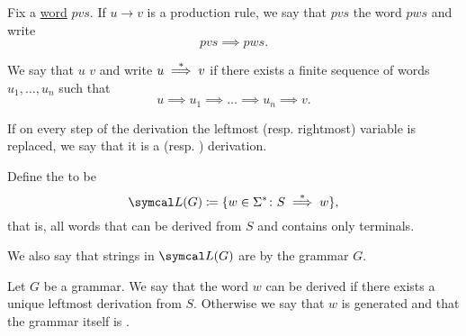 \begin{definition}\label{def:grammar_derivation}
  Fix a \hyperref[def:language/word]{word} \( pvs \). If \( u \to v \) is a production rule, we say that \( pvs \)  the word \( pws \) and write
  \begin{equation*}
    pvs \implies pws.
  \end{equation*}

  We say that \( u \)  \( v \) and write \( u \overset * \implies v \) if there exists a finite sequence of words \( u_1, \ldots, u_n \) such that
  \begin{equation*}
    u \implies u_1 \implies \ldots \implies u_n \implies v.
  \end{equation*}

  If on every step of the derivation the leftmost (resp. rightmost) variable is replaced, we say that it is a  (resp. ) derivation.

  Define the  to be
  \begin{equation*}
    \Cal{L}(G) \coloneqq \{ w \in \Sigma^* \colon S \Derives w \},
  \end{equation*}
  that is, all words that can be derived from \( S \) and contains only terminals.

  We also say that strings in \( \Cal{L}(G) \) are  by the grammar \( G \).
\end{definition}

\begin{definition}\label{def:ambiguous_grammar}
  Let \( G \) be a grammar. We say that the word \( w \) can be derived  if there exists a unique leftmost derivation from \( S \). Otherwise we say that \( w \) is generated  and that the grammar itself is .
\end{definition}

